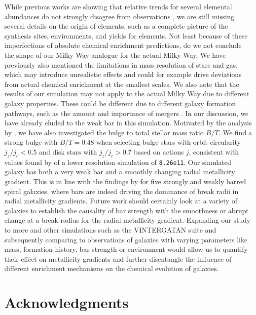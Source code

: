 \documentclass[twocolumn,apj,numberedappendix,appendixfloats]{openjournal}
\begin{document}
\begin{CJK*}{UTF8}{gbsn}
While previous works are showing that relative trends for several elemental abundances do not strongly disagree from observations \citep{Buck2021, Buder2024}, we are still missing several details on the origin of elements, such as a complete picture of the synthesis sites, environments, and yields for elements. Not least because of these imperfections of absolute chemical enrichment predictions, do we not conclude the shape of our Milky Way analogue for the actual Milky Way. We have previously also mentioned the limitations in mass resolution of stars and gas, which may introduce unrealistic effects and could for example drive deviations from actual chemical enrichment at the smallest scales. We also note that the results of our simulation may not apply to the actual Milky Way due to different galaxy properties. These could be different due to different galaxy formation pathways, such as the amount and importance of mergers \citep{Buck2023, Buder2024}. In our discussion, we have already eluded to the weak bar in this simulation. Motivated by the analysis by \citet{Tuntipong2024}, we have also investigated the bulge to total stellar mass ratio $B/T$. We find a strong bulge with $B/T = 0.48$ when selecting bulge stars with orbit circularity $j_z/j_c < 0.5$ and disk stars with $j_z/j_c > 0.7$ based on actions $j$, consistent with values found by \citet{Obreja2019} of a lower resolution simulation of \texttt{8.26e11}. Our simulated galaxy has both a very weak bar and a smoothly changing radial metallicity gradient. This is in line with the findings by \citet{Chen2023} for five strongly and weakly barred spiral galaxies, where bars are indeed driving the dominance of break radii in radial metallicity gradients. Future work should certainly look at a variety of galaxies to establish the causality of bar strength with the smoothness or abrupt change at a break radius for the radial metallicity gradient. Expanding our study to more and other simulations such as the \textsc{VINTERGATAN} suite \citep{Renaud2024} and subsequently comparing to observations of galaxies with varying parameters like mass, formation history, bar strength or environment would allow us to quantify their effect on metallicity gradients and further disentangle the influence of different enrichment mechanisms on the chemical evolution of galaxies.

\section*{Acknowledgments}


\end{CJK*}
\end{document}
